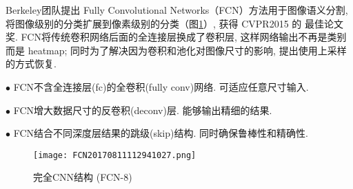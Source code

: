 Berkeley团队提出 Fully Convolutional Networks（FCN）方法用于图像语义分割, 将图像级别的分类扩展到像素级别的分类（图\ref{FCN20170811112941027}）, 获得 CVPR2015 的 最佳论文奖\cite{Long2015-9593}.
FCN将传统卷积网络后面的全连接层换成了卷积层, 这样网络输出不再是类别而是 heatmap; 同时为了解决因为卷积和池化对图像尺寸的影响, 提出使用上采样的方式恢复.

$\bullet$ FCN不含全连接层(fc)的全卷积(fully conv)网络. 可适应任意尺寸输入.

$\bullet$ FCN增大数据尺寸的反卷积(deconv)层. 能够输出精细的结果.

$\bullet$ FCN结合不同深度层结果的跳级(skip)结构. 同时确保鲁棒性和精确性.
\begin{figure}[H]
\centering
\texttt{[image: FCN20170811112941027.png]}
\caption{完全CNN结构 (FCN-8)\cite{}}
\label{FCN20170811112941027}
\end{figure}

